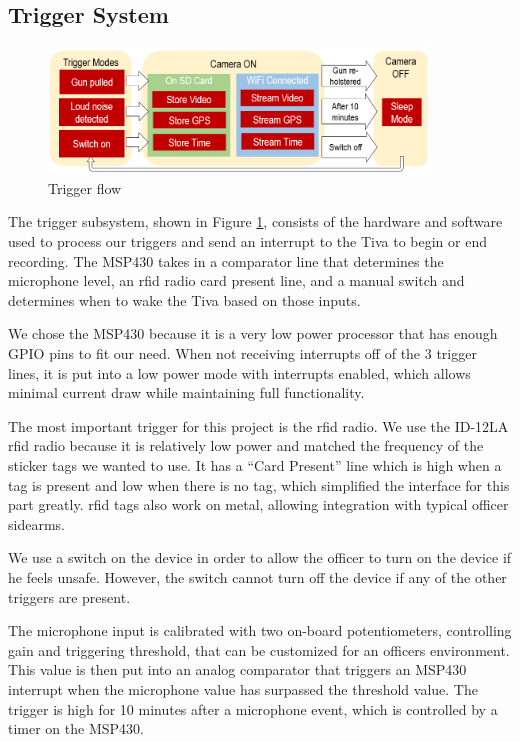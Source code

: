 \documentclass[12pt]{article}
\begin{document}
\subsection{Trigger System}
\label{sec:sys_trigger}

\begin{figure}[h]
    \centering
    \includegraphics[width=0.9\textwidth]{trigger_flow}
    \caption{Trigger flow}
    \label{fig:trigger_flow}
\end{figure}

The trigger subsystem, shown in Figure \ref{fig:trigger_flow}, consists of the
hardware and software used to process our triggers and send an interrupt to the
Tiva to begin or end recording. The MSP430 takes in a comparator line that
determines the microphone level, an \gls{rfid} radio card present line, and a
manual switch and determines when to wake the Tiva based on those inputs.

We chose the MSP430 because it is a very low power processor that has enough
GPIO pins to fit our need. When not receiving interrupts off of the 3 trigger
lines, it is put into a low power mode with interrupts enabled, which allows
minimal current draw while maintaining full functionality.

The most important trigger for this project is the \gls{rfid} radio. We use the
ID-12LA \gls{rfid} radio because it is relatively low power and matched the
frequency of the sticker tags we wanted to use. It has a ``Card Present'' line
which is high when a tag is present and low when there is no tag, which
simplified the interface for this part greatly. \gls{rfid} tags also work on
metal, allowing integration with typical officer sidearms.

We use a switch on the device in order to allow the officer to turn on the
device if he feels unsafe. However, the switch cannot turn off the device if
any of the other triggers are present. 

The microphone input is calibrated with two on-board potentiometers,
controlling gain and triggering threshold, that can be customized for an
officers environment. This value is then put into an analog comparator that
triggers an MSP430 interrupt when the microphone value has surpassed the
threshold value. The trigger is high for 10 minutes after a microphone event,
which is controlled by a timer on the MSP430.
\end{document}
